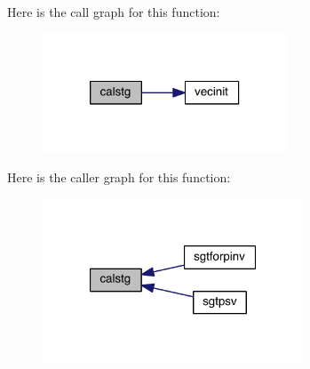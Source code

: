 Here is the call graph for this function\-:\nopagebreak
\begin{figure}[H]
\begin{center}
\leavevmode
\includegraphics[width=206pt]{others_8f90_a183435c3a12bb0faa87a88bf9649f544_cgraph}
\end{center}
\end{figure}




Here is the caller graph for this function\-:\nopagebreak
\begin{figure}[H]
\begin{center}
\leavevmode
\includegraphics[width=220pt]{others_8f90_a183435c3a12bb0faa87a88bf9649f544_icgraph}
\end{center}
\end{figure}


